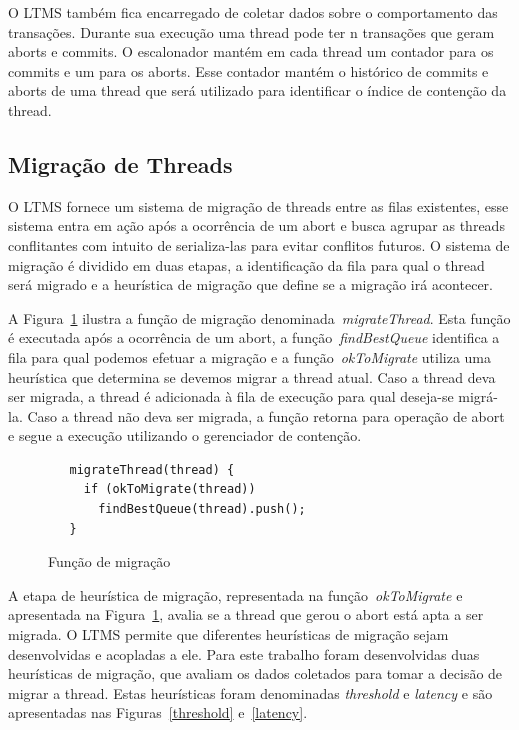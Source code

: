 \documentclass[diss,capa]{texufpel}
\begin{document}

O LTMS também fica encarregado de coletar dados sobre o comportamento das transações. Durante sua execução uma thread pode ter n transações que geram aborts e commits. O escalonador mantém em cada thread um contador para os commits e um para os aborts. Esse contador mantém o histórico de commits e aborts de uma thread que será utilizado para identificar o índice de contenção da thread.

\subsection{Migração de Threads}
\label{migracao}

O LTMS fornece um sistema de migração de threads entre as filas existentes, esse sistema entra em ação após a ocorrência de um abort e busca agrupar as threads conflitantes com intuito de serializa-las para evitar conflitos futuros. O sistema de migração é dividido em duas etapas, a identificação da fila para qual o thread será migrado e a heurística de migração que define se a migração irá acontecer.

A Figura~\ref{migration} ilustra a função de migração denominada~\emph{migrateThread}. Esta função é executada após a ocorrência de um abort, a função~\emph{findBestQueue} identifica a fila para qual podemos efetuar a migração e a função~\emph{okToMigrate} utiliza uma heurística que determina se devemos migrar a thread atual. Caso a thread deva ser migrada, a thread é adicionada à fila de execução para qual deseja-se migrá-la. Caso a thread não deva ser migrada, a função retorna para operação de abort e segue a execução utilizando o gerenciador de contenção.

\begin{figure}[htbp]
 \centering
 \begin{lstlisting}
   migrateThread(thread) {
     if (okToMigrate(thread))
       findBestQueue(thread).push();
   }
 \end{lstlisting}
 \caption{Função de migração}
 \label{migration}
\end{figure}

A etapa de heurística de migração, representada na função~\emph{okToMigrate} e apresentada na Figura~\ref{migration}, avalia se a thread que gerou o abort está apta a ser migrada. O LTMS permite que diferentes heurísticas de migração sejam desenvolvidas e acopladas a ele.  Para este trabalho foram desenvolvidas duas heurísticas de migração, que avaliam os dados coletados para tomar a decisão de migrar a thread. Estas heurísticas foram denominadas \emph{threshold} e \emph{latency} e são apresentadas nas Figuras~\ref{threshold} e~\ref{latency}.
\end{document}
